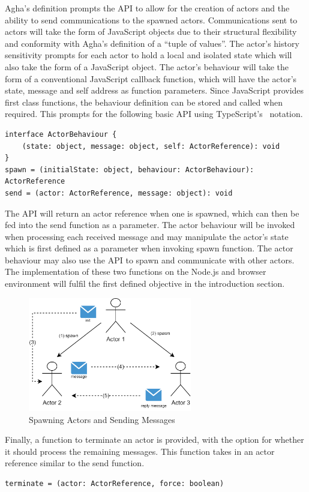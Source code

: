 \documentclass[oneside]{um-fict}
\begin{document}
Agha's definition prompts the API to allow for the creation of actors and the ability to send communications to the spawned actors. Communications sent to actors will take the form of JavaScript objects due to their structural flexibility and conformity with Agha's definition of a “tuple of values”. The actor's history sensitivity prompts for each actor to hold a local and isolated state which will also take the form of a JavaScript object. The actor's behaviour will take the form of a conventional JavaScript callback function, which will have the actor's state, message and self address as function parameters. Since JavaScript provides first class functions, the behaviour definition can be stored and called when required. This prompts for the following basic API using TypeScript's~\cite{typescript} notation.
\begin{lstlisting}
interface ActorBehaviour {
    (state: object, message: object, self: ActorReference): void
}
spawn = (initialState: object, behaviour: ActorBehaviour): ActorReference
send = (actor: ActorReference, message: object): void    
\end{lstlisting}
The API will return an actor reference when one is spawned, which can then be fed into the send function as a parameter. The actor behaviour will be invoked when processing each received message and may manipulate the actor's state which is first defined as a parameter when invoking spawn function. The actor behaviour may also use the API to spawn and communicate with other actors. The implementation of these two functions on the Node.js and browser environment will fulfil the first defined objective in the introduction section. 
\begin{figure}[H]
    \begin{centering}
        \includegraphics[width=270px]{resources/actors.png}
        \caption{Spawning Actors and Sending Messages}
    \end{centering}
\end{figure}
Finally, a function to terminate an actor is provided, with the option for whether it should process the remaining messages. This function takes in an actor reference similar to the send function.
\begin{lstlisting}
terminate = (actor: ActorReference, force: boolean)
\end{lstlisting}
\end{document}
